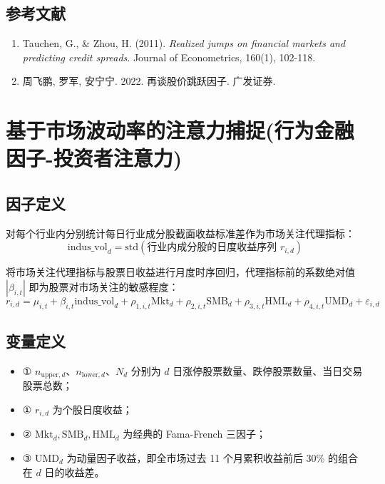 \documentclass{article}
\begin{document}
\subsection{参考文献}
\begin{enumerate}
    \item Tauchen, G., \& Zhou, H. (2011). \textit{Realized jumps on financial markets and predicting credit spreads}. Journal of Econometrics, 160(1), 102-118.
    \item 周飞鹏, 罗军, 安宁宁. 2022. 再谈股价跳跃因子. 广发证券.
\end{enumerate}

\section{基于市场波动率的注意力捕捉(行为金融因子-投资者注意力)}

\subsection{因子定义}

对每个行业内分别统计每日行业成分股截面收益标准差作为市场关注代理指标：
\begin{equation}
    \mathrm{indus\_vol}_d = \mathrm{std}(\text{行业内成分股的日度收益序列 } r_{i,d})
\end{equation}

将市场关注代理指标与股票日收益进行月度时序回归，代理指标前的系数绝对值 \(|\beta_{i,t}|\) 即为股票对市场关注的敏感程度：
\begin{equation}
    r_{i,d} = \mu_{i,t} + \beta_{i,t} \mathrm{indus\_vol}_d + \rho_{1,i,t} \mathrm{Mkt}_d + \rho_{2,i,t} \mathrm{SMB}_d + \rho_{3,i,t} \mathrm{HML}_d + \rho_{4,i,t} \mathrm{UMD}_d + \varepsilon_{i,d}
\end{equation}

\subsection{变量定义}
\begin{itemize}
     \item ① \(n_{\mathrm{upper},d}\)、\(n_{\mathrm{lower},d}\)、\(N_d\) 分别为 \(d\) 日涨停股票数量、跌停股票数量、当日交易股票总数；
    \item ① \( r_{i,d} \) 为个股日度收益；
    \item ② \( \mathrm{Mkt}_d, \mathrm{SMB}_d, \mathrm{HML}_d \) 为经典的 Fama-French 三因子；
    \item ③ \( \mathrm{UMD}_d \) 为动量因子收益，即全市场过去 11 个月累积收益前后 30\% 的组合在 \( d \) 日的收益差。
\end{itemize}
\end{document}
